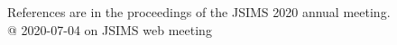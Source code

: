 \documentclass[portrait,a0,oldgerm]{a0poster}
\def\spaceV{\ \ \ \ \ }
\def\areaspace{9.4mm}
\begin{document}

\begin{center}
\noindent 
\end{center}

\begin{center}
\noindent 
\end{center}

\begin{center}
\noindent 
\end{center}

\begin{center}
\noindent 
\end{center}

\color[cmyk]{0,0,0,1}
\linespread{1.0}\fontsize{22}{20}\selectfont
\begin{flushright}
References are in the proceedings of the JSIMS 2020 annual meeting. \\
@ 2020-07-04 on JSIMS web meeting
\end{flushright}





\end{document}
